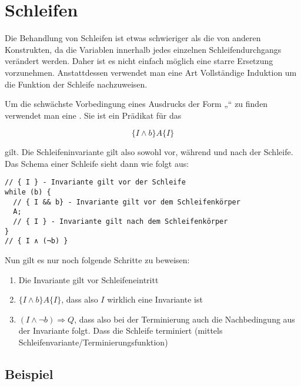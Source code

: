 \documentclass{lehramt-informatik}
\begin{document}
%

\section{Schleifen}

Die Behandlung von Schleifen ist etwas schwieriger als die von anderen
Konstrukten, da die Variablen innerhalb jedes einzelnen
Schleifendurchgangs verändert werden. Daher ist es nicht einfach möglich
eine starre Ersetzung vorzunehmen. Anstattdessen verwendet man eine Art
Vollständige Induktion um die Funktion der Schleife nachzuweisen.

Um die schwächste Vorbedingung eines Ausdrucks der Form „“ zu finden verwendet man eine . Sie
ist ein Prädikat für das

\begin{displaymath}
\{ I \wedge b \} A \{ I \}
\end{displaymath}

\noindent
gilt. Die Schleifeninvariante gilt also sowohl vor, während und nach der
Schleife. Das Schema einer Schleife sieht dann wie folgt aus:

\begin{verbatim}
// { I } - Invariante gilt vor der Schleife
while (b) {
  // { I && b} - Invariante gilt vor dem Schleifenkörper
  A;
  // { I } - Invariante gilt nach dem Schleifenkörper
}
// { I ∧ (¬b) }
\end{verbatim}

Nun gilt es nur noch folgende Schritte zu beweisen:

\begin{enumerate}
\item Die Invariante gilt vor Schleifeneintritt

\item $\{ I \wedge b \} A \{ I \}$, dass also $I$ wirklich eine
Invariante ist

\item $(I \wedge \neg b) \Rightarrow Q$, dass also bei der Terminierung
auch die Nachbedingung aus der Invariante folgt. Dass die Schleife
terminiert (mittels Schleifenvariante/Terminierungsfunktion)
\end{enumerate}

\subsection{Beispiel}
\end{document}
